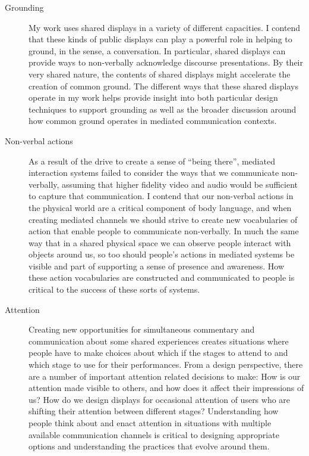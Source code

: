 \begin{description}
	\item[Grounding]{My work uses shared displays in a variety of different capacities. I contend that these kinds of public displays can play a powerful role in helping to ground, in the \citet{Clark:1989uc} sense, a conversation. In particular, shared displays can provide ways to non-verbally acknowledge discourse presentations. By their very shared nature, the contents of shared displays might accelerate the creation of common ground. The different ways that these shared displays operate in my work helps provide insight into both particular design techniques to support grounding as well as the broader discussion around how common ground operates in mediated communication contexts.}
	\item[Non-verbal actions]{As a result of the drive to create a sense of ``being there'', mediated interaction systems failed to consider the ways that we communicate non-verbally, assuming that higher fidelity video and audio would be sufficient to capture that communication. I contend that our non-verbal actions in the physical world are a critical component of body language, and when creating mediated channels we should strive to create new vocabularies of action that enable people to communicate non-verbally. In much the same way that in a shared physical space we can observe people interact with objects around us, so too should people's actions in mediated systems be visible and part of supporting a sense of presence and awareness. How these action vocabularies are constructed and communicated to people is critical to the success of these sorts of systems.}
	\item[Attention]{Creating new opportunities for simultaneous commentary and communication about some shared experiences creates situations where people have to make choices about which if the stages to attend to and which stage to use for their performances. From a design perspective, there are a number of important attention related decisions to make: How is our attention made visible to others, and how does it affect their impressions of us? How do we design displays for occasional attention of users who are shifting their attention between different stages? Understanding how people think about and enact attention in situations with multiple available communication channels is critical to designing appropriate options and understanding the practices that evolve around them.}
\end{description}

